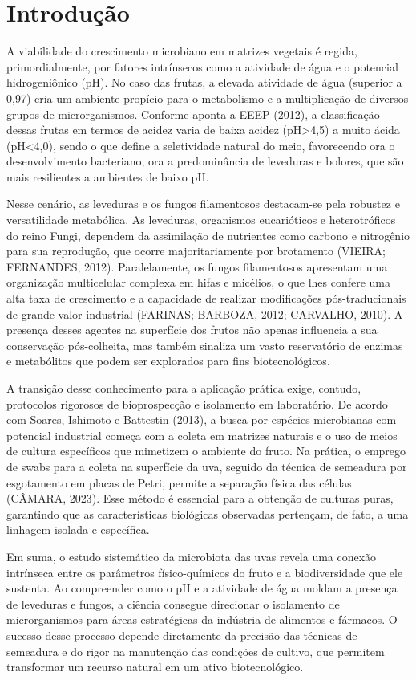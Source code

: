 
\section{Introdução}

A viabilidade do crescimento microbiano em matrizes vegetais é regida, primordialmente, por fatores intrínsecos como a atividade de água e o potencial hidrogeniônico (pH). No caso das frutas, a elevada atividade de água (superior a 0,97) cria um ambiente propício para o metabolismo e a multiplicação de diversos grupos de microrganismos. Conforme aponta a EEEP (2012), a classificação dessas frutas em termos de acidez varia de baixa acidez (pH>4,5) a muito ácida (pH<4,0), sendo o que define a seletividade natural do meio, favorecendo ora o desenvolvimento bacteriano, ora a predominância de leveduras e bolores, que são mais resilientes a ambientes de baixo pH.

Nesse cenário, as leveduras e os fungos filamentosos destacam-se pela robustez e versatilidade metabólica. As leveduras, organismos eucarióticos e heterotróficos do reino Fungi, dependem da assimilação de nutrientes como carbono e nitrogênio para sua reprodução, que ocorre majoritariamente por brotamento (VIEIRA; FERNANDES, 2012). Paralelamente, os fungos filamentosos apresentam uma organização multicelular complexa em hifas e micélios, o que lhes confere uma alta taxa de crescimento e a capacidade de realizar modificações pós-traducionais de grande valor industrial (FARINAS; BARBOZA, 2012; CARVALHO, 2010). A presença desses agentes na superfície dos frutos não apenas influencia a sua conservação pós-colheita, mas também sinaliza um vasto reservatório de enzimas e metabólitos que podem ser explorados para fins biotecnológicos.

A transição desse conhecimento para a aplicação prática exige, contudo, protocolos rigorosos de bioprospecção e isolamento em laboratório. De acordo com Soares, Ishimoto e Battestin (2013), a busca por espécies microbianas com potencial industrial começa com a coleta em matrizes naturais e o uso de meios de cultura específicos que mimetizem o ambiente do fruto. Na prática, o emprego de swabs para a coleta na superfície da uva, seguido da técnica de semeadura por esgotamento em placas de Petri, permite a separação física das células (CÂMARA, 2023). Esse método é essencial para a obtenção de culturas puras, garantindo que as características biológicas observadas pertençam, de fato, a uma linhagem isolada e específica.

Em suma, o estudo sistemático da microbiota das uvas revela uma conexão intrínseca entre os parâmetros físico-químicos do fruto e a biodiversidade que ele sustenta. Ao compreender como o pH e a atividade de água moldam a presença de leveduras e fungos, a ciência consegue direcionar o isolamento de microrganismos para áreas estratégicas da indústria de alimentos e fármacos. O sucesso desse processo depende diretamente da precisão das técnicas de semeadura e do rigor na manutenção das condições de cultivo, que permitem transformar um recurso natural em um ativo biotecnológico.
